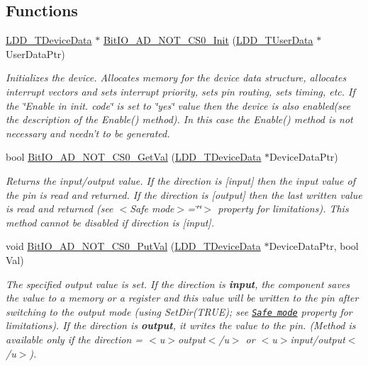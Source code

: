 \subsection*{Functions}
\begin{DoxyCompactItemize}
\item 
\hyperlink{group___p_e___types__module_gac5cf1362f1f0e3a2ce71b1bf2276d091}{L\-D\-D\-\_\-\-T\-Device\-Data} $\ast$ \hyperlink{group___bit_i_o___a_d___n_o_t___c_s0__module_ga327b32c439270281e76ce9b84ee9a70c}{Bit\-I\-O\-\_\-\-A\-D\-\_\-\-N\-O\-T\-\_\-\-C\-S0\-\_\-\-Init} (\hyperlink{group___p_e___types__module_ga0b66a73f87238a782318aa0be7578e35}{L\-D\-D\-\_\-\-T\-User\-Data} $\ast$User\-Data\-Ptr)
\begin{DoxyCompactList}\small\item\em Initializes the device. Allocates memory for the device data structure, allocates interrupt vectors and sets interrupt priority, sets pin routing, sets timing, etc. If the \char`\"{}\-Enable
    in init. code\char`\"{} is set to \char`\"{}yes\char`\"{} value then the device is also enabled(see the description of the Enable() method). In this case the Enable() method is not necessary and needn't to be generated. \end{DoxyCompactList}\item 
bool \hyperlink{group___bit_i_o___a_d___n_o_t___c_s0__module_gad587b90bb72fefd0b3d60234dc31812a}{Bit\-I\-O\-\_\-\-A\-D\-\_\-\-N\-O\-T\-\_\-\-C\-S0\-\_\-\-Get\-Val} (\hyperlink{group___p_e___types__module_gac5cf1362f1f0e3a2ce71b1bf2276d091}{L\-D\-D\-\_\-\-T\-Device\-Data} $\ast$Device\-Data\-Ptr)
\begin{DoxyCompactList}\small\item\em Returns the input/output value. If the direction is \mbox{[}input\mbox{]} then the input value of the pin is read and returned. If the direction is \mbox{[}output\mbox{]} then the last written value is read and returned (see $<$\-Safe mode$>$=\char`\"{}\char`\"{}$>$ property for limitations). This method cannot be disabled if direction is \mbox{[}input\mbox{]}. \end{DoxyCompactList}\item 
void \hyperlink{group___bit_i_o___a_d___n_o_t___c_s0__module_ga208aa26a7fea5ab2892ed0054c042390}{Bit\-I\-O\-\_\-\-A\-D\-\_\-\-N\-O\-T\-\_\-\-C\-S0\-\_\-\-Put\-Val} (\hyperlink{group___p_e___types__module_gac5cf1362f1f0e3a2ce71b1bf2276d091}{L\-D\-D\-\_\-\-T\-Device\-Data} $\ast$Device\-Data\-Ptr, bool Val)
\begin{DoxyCompactList}\small\item\em The specified output value is set. If the direction is {\bfseries  input}, the component saves the value to a memory or a register and this value will be written to the pin after switching to the output mode (using {\ttfamily Set\-Dir(\-T\-R\-U\-E)}; see \href{BitIOProperties.html#SafeMode}{\tt Safe mode} property for limitations). If the direction is {\bfseries output}, it writes the value to the pin. (Method is available only if the direction = $<$u$>${\ttfamily output}$<$/u$>$ or $<$u$>${\ttfamily  input/output}$<$/u$>$). \end{DoxyCompactList}\item 

\end{DoxyCompactItemize}
